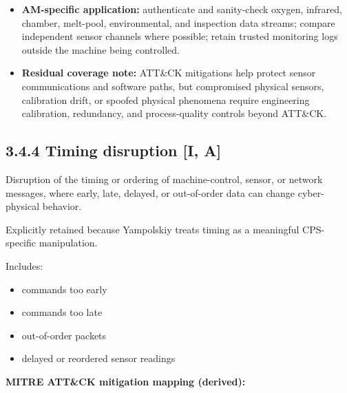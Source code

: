 \documentclass[10pt,a4paper,oneside]{report}
\begin{document}
\begin{itemize}
\item \textbf{AM-specific application:} authenticate and sanity-check oxygen, infrared, chamber, melt-pool, environmental, and inspection data streams; compare independent sensor channels where possible; retain trusted monitoring logs outside the machine being controlled.
\end{itemize}

\begin{itemize}
\item \textbf{Residual coverage note:} ATT\&CK mitigations help protect sensor communications and software paths, but compromised physical sensors, calibration drift, or spoofed physical phenomena require engineering calibration, redundancy, and process-quality controls beyond ATT\&CK.
\end{itemize}


\subsection{3.4.4 Timing disruption [I, A]}


Disruption of the timing or ordering of machine-control, sensor, or network messages, where early, late, delayed, or out-of-order data can change cyber-physical behavior.

Explicitly retained because Yampolskiy treats timing as a meaningful CPS-specific manipulation.

Includes:

\begin{itemize}
\item commands too early
\item commands too late
\item out-of-order packets
\item delayed or reordered sensor readings
\end{itemize}

\textbf{MITRE ATT\&CK mitigation mapping (derived):}
\end{document}
